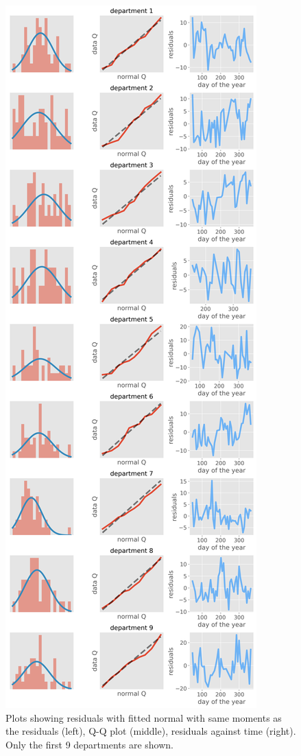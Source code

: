 \documentclass[paper=a4, fontsize=11pt]{scrartcl}
\begin{document}
    
\begin{figure}[!htb]\label{normal}
\centering
\includegraphics[width=.5\textwidth]{normal_approx_1.png}
\caption{Plots showing residuals with fitted normal with same moments as the residuals (left), Q-Q plot (middle), residuals against time (right). Only the first 9 departments are shown.}
\end{figure}
\end{document}
